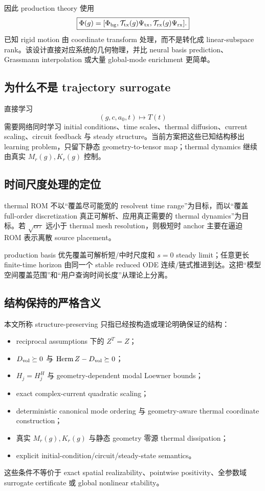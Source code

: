 因此 production theory 使用
\begin{equation}
\boxed{
\Phi(g)=
[\Phi_{\rm bg},\mathcal T_{\rm tx}(g)\Psi_{\rm tx},\mathcal T_{\rm rx}(g)\Psi_{\rm rx}].
}
\end{equation}
已知 rigid motion 由 coordinate transform 处理，而不是转化成 linear-subspace rank。该设计直接对应系统的几何物理，并比 neural basis prediction、Grassmann interpolation 或大量 global-mode enrichment 更简单。

\subsection{为什么不是 trajectory surrogate}
直接学习
\begin{equation}
(g,c,a_0,t)\mapsto T(t)
\end{equation}
需要网络同时学习 initial conditions、time scales、thermal diffusion、current scaling、circuit feedback 与 steady structure。当前方案把这些已知结构移出 learning problem，只留下静态 geometry-to-tensor map；thermal dynamics 继续由真实 $M_r(g),K_r(g)$ 控制。

\subsection{时间尺度处理的定位}
thermal ROM 不以“覆盖尽可能宽的 resolvent time range”为目标，而以“覆盖 full-order discretization 真正可解析、应用真正需要的 thermal dynamics”为目标。若 $\sqrt{\alpha\tau}$ 远小于 thermal mesh resolution，则极短时 anchor 主要在逼迫 ROM 表示离散 source placement。

production basis 优先覆盖可解析短/中时尺度和 $s=0$ steady limit；任意更长 finite-time horizon 由同一个 stable reduced ODE 连续/链式推进到达。这把“模型空间覆盖范围”和“用户查询时间长度”从理论上分离。

\subsection{结构保持的严格含义}
本文所称 structure-preserving 只指已经按构造或理论明确保证的结构：
\begin{itemize}
  \item reciprocal assumptions 下的 $Z^T=Z$；
  \item $D_{\rm vol}\succeq0$ 与 $\operatorname{Herm}Z-D_{\rm vol}\succeq0$；
  \item $H_j=H_j^H$ 与 geometry-dependent modal Loewner bounds；
  \item exact complex-current quadratic scaling；
  \item deterministic canonical mode ordering 与 geometry-aware thermal coordinate construction；
  \item 真实 $M_r(g),K_r(g)$ 与静态 geometry 零源 thermal dissipation；
  \item explicit initial-condition/circuit/steady-state semantics。
\end{itemize}
这些条件不等价于 exact spatial realizability、pointwise positivity、全参数域 surrogate certificate 或 global nonlinear stability。

